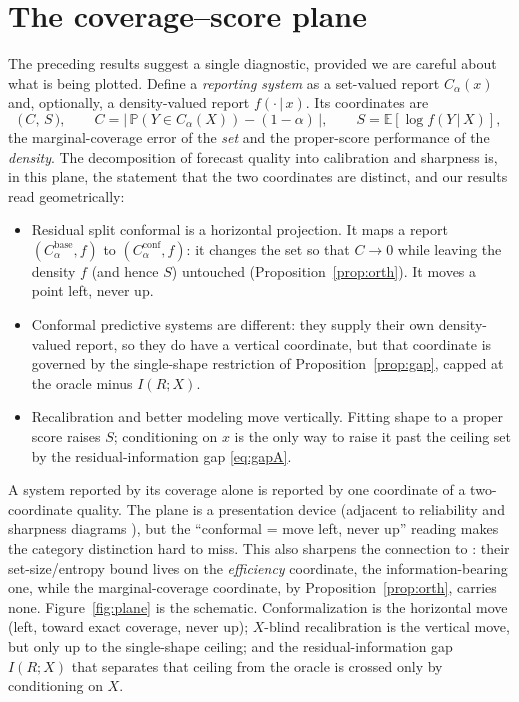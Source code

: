 \documentclass[11pt]{article}
\theoremstyle{definition}
\newcommand{\E}{\mathbb{E}}
\renewcommand{\Pr}{\mathbb{P}}
\newcommand{\given}{\,\vert\,}
\begin{document}
\section{The coverage--score plane}\label{sec:plane}

The preceding results suggest a single diagnostic, provided we are careful about what is
being plotted. Define a \emph{reporting system} as a set-valued report $C_\alpha(x)$ and,
optionally, a density-valued report $f(\cdot\given x)$. Its coordinates are
\begin{equation}
  \big(\,C,\,S\,\big),\qquad
  C=\big|\,\Pr(Y\in C_\alpha(X))-(1-\alpha)\,\big|,\qquad
  S=\E[\log f(Y\given X)],
\end{equation}
the marginal-coverage error of the \emph{set} and the proper-score performance of the
\emph{density}. The decomposition of forecast quality into calibration and sharpness
\citep{gneiting2007probabilistic} is, in this plane, the statement that the two
coordinates are distinct, and our results read geometrically:
\begin{itemize}
  \item Residual split conformal is a horizontal projection. It maps a report
  $(C_\alpha^{\text{base}},f)$ to $(C_\alpha^{\text{conf}},f)$: it changes the set so that
  $C\to 0$ while leaving the density $f$ (and hence $S$) untouched
  (Proposition~\ref{prop:orth}). It moves a point left, never up.
  \item Conformal predictive systems are different: they supply their own
  density-valued report, so they do have a vertical coordinate, but that coordinate is
  governed by the single-shape restriction of Proposition~\ref{prop:gap}, capped at the
  oracle minus $I(R;X)$.
  \item Recalibration and better modeling move vertically. Fitting shape to a
  proper score raises $S$; conditioning on $x$ is the only way to raise it past the
  ceiling set by the residual-information gap \eqref{eq:gapA}.
\end{itemize}
A system reported by its coverage alone is reported by one coordinate of a
two-coordinate quality. The plane is a presentation device (adjacent to reliability
and sharpness diagrams \citep{gneiting2007probabilistic}), but the ``conformal = move
left, never up'' reading makes the category distinction hard to miss. This also sharpens
the connection to \citet{correia2024information}: their set-size/entropy bound lives on the
\emph{efficiency} coordinate, the information-bearing one, while the marginal-coverage
coordinate, by Proposition~\ref{prop:orth}, carries none. Figure~\ref{fig:plane} is the
schematic. Conformalization is the horizontal move (left, toward exact coverage, never up);
$X$-blind recalibration is the vertical move, but only up to the single-shape ceiling; and
the residual-information gap $I(R;X)$ that separates that ceiling from the oracle is crossed
only by conditioning on $X$.
\end{document}
